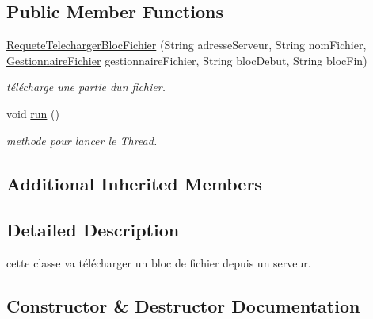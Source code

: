 \subsection*{Public Member Functions}
\begin{DoxyCompactItemize}
\item 
\hyperlink{classrequete_1_1RequeteTelechargerBlocFichier_aff47f4619365925874158d0721f392e6}{Requete\+Telecharger\+Bloc\+Fichier} (String adresse\+Serveur, String nom\+Fichier, \hyperlink{classcommon_1_1GestionnaireFichier}{Gestionnaire\+Fichier} gestionnaire\+Fichier, String bloc\+Debut, String bloc\+Fin)
\begin{DoxyCompactList}\small\item\em télécharge une partie d\textquotesingle{}un fichier. \end{DoxyCompactList}\item 
\mbox{\label{classrequete_1_1RequeteTelechargerBlocFichier_aca582462ab48dda6d3eaa26b6ca7b976}} 
void \hyperlink{classrequete_1_1RequeteTelechargerBlocFichier_aca582462ab48dda6d3eaa26b6ca7b976}{run} ()
\begin{DoxyCompactList}\small\item\em methode pour lancer le Thread. \end{DoxyCompactList}\end{DoxyCompactItemize}
\subsection*{Additional Inherited Members}


\subsection{Detailed Description}
cette classe va télécharger un bloc de fichier depuis un serveur. 

\subsection{Constructor \& Destructor Documentation}
\mbox{\label{classrequete_1_1RequeteTelechargerBlocFichier_aff47f4619365925874158d0721f392e6}} 
